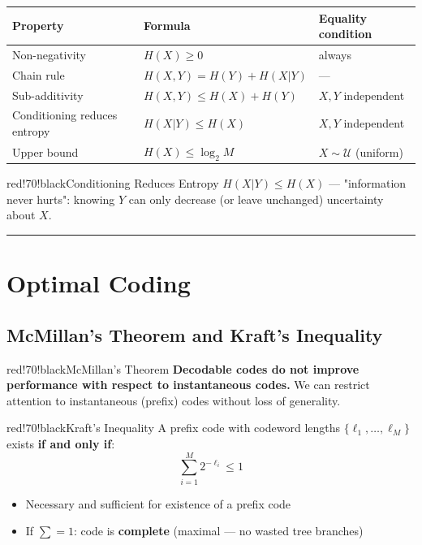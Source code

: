 \begin{center}
\begin{tabular}{|l|l|l|}
\hline
\textbf{Property} & \textbf{Formula} & \textbf{Equality condition} \\ \hline
Non-negativity & $H(X) \geq 0$ & always \\ \hline
Chain rule & $H(X,Y) = H(Y) + H(X|Y)$ & — \\ \hline
Sub-additivity & $H(X,Y) \leq H(X) + H(Y)$ & $X, Y$ independent \\ \hline
Conditioning reduces entropy & $H(X|Y) \leq H(X)$ & $X, Y$ independent \\ \hline
Upper bound & $H(X) \leq \log_2 M$ & $X \sim \mathcal{U}$ (uniform) \\ \hline
\end{tabular}
\end{center}

\begin{calloutbox}{red!70!black}{Conditioning Reduces Entropy}
$H(X|Y) \leq H(X)$ — "information never hurts": knowing $Y$ can only decrease (or leave unchanged) uncertainty about $X$.
\end{calloutbox}

\bigskip\hrule\bigskip

\section{Optimal Coding}

\subsection{McMillan's Theorem and Kraft's Inequality}

\begin{calloutbox}{red!70!black}{McMillan's Theorem}
\textbf{Decodable codes do not improve performance with respect to instantaneous codes.} We can restrict attention to instantaneous (prefix) codes without loss of generality.
\end{calloutbox}

\begin{calloutbox}{red!70!black}{Kraft's Inequality}
A prefix code with codeword lengths $\{\ell_1, \ldots, \ell_M\}$ exists \textbf{if and only if}:
\[
\sum_{i=1}^{M} 2^{-\ell_i} \leq 1
\]

\begin{itemize}
\item Necessary and sufficient for existence of a prefix code
\item If $\sum = 1$: code is \textbf{complete} (maximal — no wasted tree branches)
\end{itemize}
\end{calloutbox}

